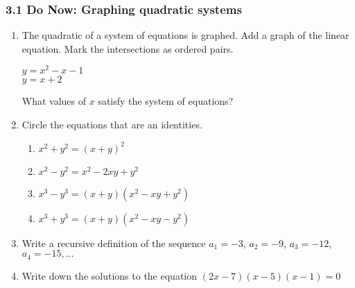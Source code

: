 \documentclass[12pt, twoside]{article}
\begin{document}
\subsubsection*{3.1 Do Now: Graphing quadratic systems}
\begin{enumerate}
  \item The quadratic of a system of equations is graphed. Add a graph of the linear equation. Mark the intersections as ordered pairs.

  \begin{multicols}{2}
    $y = x^2 - x - 1$ \\
    \columnbreak
    $y = x + 2$
    \end{multicols}
    What values of $x$ satisfy the system of equations? \vspace{2cm}

  \begin{center}
  \end{center}

\newpage
\item Circle the equations that are an identities.
    \begin{multicols}{2}
      \begin{enumerate}
        \item \(x^2 + y^2 = (x + y)^2\)
        \item \(x^2 - y^2 = x^2 - 2xy + y^2\)
        \item \(x^3 - y^3 = (x + y)(x^2 - xy + y^2)\)
        \item \(x^3 + y^3 = (x + y)(x^2 - xy - y^2)\)
      \end{enumerate}
    \end{multicols}

\item Write a recursive definition of the sequence $a_1 = -3$, $a_2 = -9$, $a_3 = -12$, $a_4 = -15, \ldots$ \vspace{2cm}
    
\item Write down the solutions to the equation $(2x-7)(x - 5)(x - 1) = 0$ \vspace{2cm}


\end{enumerate}
\end{document}
